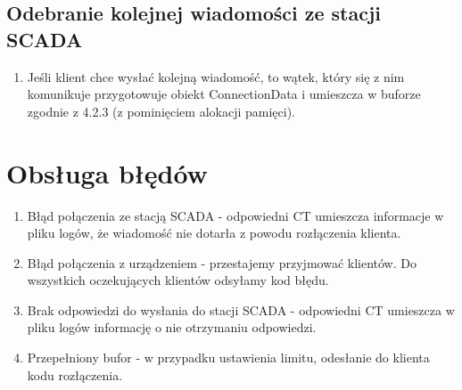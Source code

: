 \documentclass[a4paper]{article}
\begin{document}
\subsection{Odebranie kolejnej wiadomości ze stacji SCADA}
\begin{enumerate}
\item Jeśli klient chce wysłać kolejną wiadomość, to wątek, który się z nim komunikuje przygotowuje obiekt {ConnectionData} i umieszcza w buforze zgodnie z 4.2.3 (z pominięciem alokacji pamięci).
\end{enumerate}

\section{Obsługa błędów}
\begin{enumerate}
\item Błąd połączenia ze stacją SCADA - odpowiedni CT umieszcza informacje w pliku logów, że wiadomość nie dotarła z powodu rozłączenia klienta.
\item Błąd połączenia z urządzeniem - przestajemy przyjmować klientów. Do wszystkich oczekujących klientów odsyłamy kod błędu.
\item Brak odpowiedzi do wysłania do stacji SCADA - odpowiedni CT umieszcza w pliku logów informację o nie otrzymaniu odpowiedzi.
\item Przepełniony bufor - w przypadku ustawienia limitu, odesłanie do klienta kodu rozłączenia.
\end{enumerate}
\end{document}
